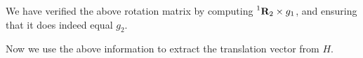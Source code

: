 \documentclass[12pt, oneside]{article}
\begin{document}
We have verified the above rotation matrix by computing 
$ \prescript{1}{}{\mathbf{R}_2} \times g_1$, and ensuring that it does indeed
equal $g_2$.

Now we use the above information to extract the translation vector from $H$.

\end{document}
